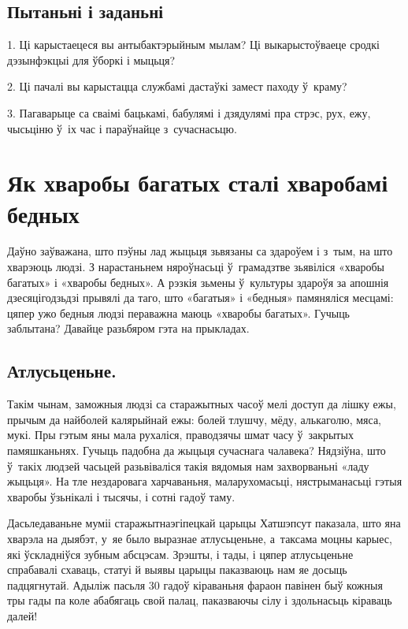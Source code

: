 \subsection*{Пытаньні і заданьні}

1. Ці карыстаецеся вы антыбактэрыйным мылам? Ці выкарыстоўваеце сродкі дэзынфэкцыі для ўборкі і мыцьця?

2. Ці пачалі вы карыстацца службамі дастаўкі замест паходу ў~краму?

3. Пагаварыце са сваімі бацькамі, бабулямі і дзядулямі пра стрэс, рух, ежу, чысьціню ў~іх час і параўнайце з~сучаснасьцю.


\section{Як хваробы багатых сталі хваробамі бедных}

Даўно заўважана, што пэўны лад жыцьця зьвязаны са здароўем і з~тым, на што хварэюць людзі. З нарастаньнем няроўнасьці ў~грамадзтве зьявіліся «хваробы багатых» і «хваробы бедных». А рэзкія зьмены ў~культуры здароўя за апошнія дзесяцігодзьдзі прывялі да таго, што «багатыя» і «бедныя» памяняліся месцамі: цяпер ужо бедныя людзі пераважна маюць «хваробы багатых». Гучыць заблытана? Давайце разьбяром гэта на прыкладах.

\subsection*{Атлусьценьне.}

Такім чынам, заможныя людзі са старажытных часоў мелі доступ да лішку ежы, прычым да найболей калярыйнай ежы: болей тлушчу, мёду, алькаголю, мяса, мукі. Пры гэтым яны мала рухаліся, праводзячы шмат часу ў~закрытых памяшканьнях. Гучыць падобна да жыцьця сучаснага чалавека? Нядзіўна, што ў~такіх людзей часьцей разьвіваліся такія вядомыя нам захворваньні «ладу жыцьця». На тле нездаровага харчаваньня, маларухомасьці, нястрыманасьці гэтыя хваробы ўзьнікалі і тысячы, і сотні гадоў таму.

Дасьледаваньне муміі старажытнаэгіпецкай царыцы Хатшэпсут паказала, што яна хварэла на дыябэт, у~яе было выразнае атлусьценьне, а~таксама моцны карыес, які ўскладніўся зубным абсцэсам. Зрэшты, і тады, і цяпер атлусьценьне спрабавалі схаваць, статуі й выявы царыцы паказваюць нам яе досыць падцягнутай. Адыліж пасьля 30 гадоў кіраваньня фараон павінен быў кожныя тры гады па коле абабягаць свой палац, паказваючы сілу і здольнасьць кіраваць далей!

